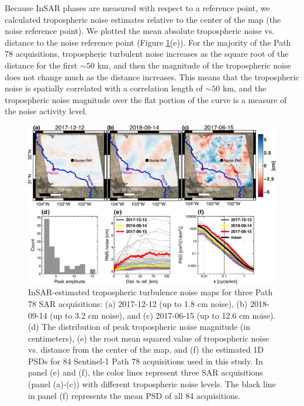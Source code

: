 Because InSAR phases are measured with respect to a reference point, we calculated tropospheric noise estimates relative to the center of the map (the noise reference point). We plotted the mean absolute tropospheric noise vs. distance to the noise reference point (Figure \ref{fig:results-noise}(e)). For the majority of the Path 78 acquisitions, tropospheric turbulent noise increases as the square root of the distance for the first $\sim 50$ km, and then the magnitude of the tropospheric noise does not change much as the distance increases. This means that the tropospheric noise is spatially correlated with a correlation length of $\sim 50$ km, and the tropospheric noise magnitude over the flat portion of the curve is a measure of the noise activity level. 



\begin{figure}
	\centering 
	\includegraphics[width=0.98\linewidth]{figures/chapter6-blobs/figure5_noise_path78.pdf}
	\caption[Path 78 estimated tropospheric turbulence noise maps]{
		InSAR-estimated tropospheric turbulence noise maps for three Path 78 SAR acquisitions: (a) 2017-12-12 (up to 1.8 cm noise), (b) 2018-09-14 (up to 3.2 cm noise), and (c) 2017-06-15  (up to 12.6 cm noise).
		(d) The distribution of peak tropospheric noise magnitude (in centimeters), (e) the root mean squared value of tropospheric noise vs. distance from the center of the map, and (f) the estimated 1D PSDs for 84 Sentinel-1 Path 78 acquisitions used in this study. In panel (e) and (f), the color lines represent three SAR acquisitions (panel (a)-(c)) with different tropospheric noise levels. The black line in panel (f) represents the mean PSD of all 84 acquisitions.}
	\label{fig:results-noise}
\end{figure}


